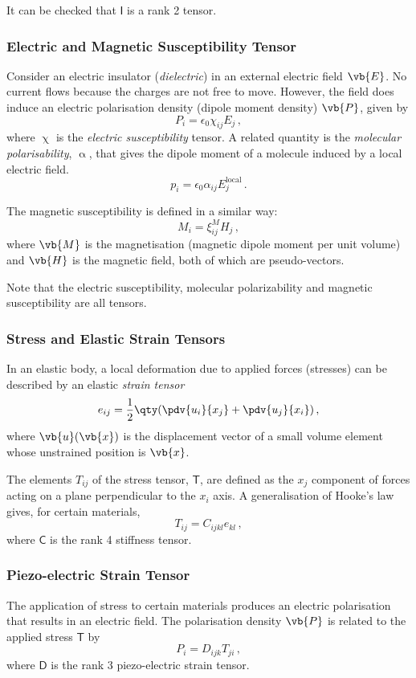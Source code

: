 \documentclass{article}
\theoremstyle{plain}\theoremheaderfont{\normalfont\itshape}\theorembodyfont{\rmfamily}\theoremseparator{.}\newtheorem*{rem}{Remark}\newtheorem*{ex}{Example}\newtheorem*{proof}{Proof}\newtheorem*{altp}{Alternative proof}
\theoremstyle{plain}\theoremheaderfont{\normalfont\bfseries}\theorembodyfont{\rmfamily}\theoremseparator{.}\newtheorem{thm}{Theorem}[section]\newtheorem{lem}[thm]{Lemma}\newtheorem{prop}[thm]{Proposition}\newtheorem*{cor}{Corollary}\newtheorem{defn}[thm]{Definition}\newtheorem{clm}[thm]{Claim}\newtheorem{clminproof}{Claim}
\theoremstyle{break}\theoremheaderfont{\normalfont\itshape}\theorembodyfont{\rmfamily}\theoremseparator{.\medskip}\newtheorem*{proofskip}{Proof}\newtheorem*{exs}{Examples}\newtheorem*{rems}{Remarks}
\theoremstyle{break}\theoremheaderfont{\normalfont\bfseries}\theorembodyfont{\rmfamily}\theoremseparator{.\medskip}\newtheorem{lemskip}[thm]{Lemma}\newtheorem{defnskip}[thm]{Definition}\newtheorem{propskip}[thm]{Proposition}\newtheorem{thmskip}[thm]{Theorem}
\numberwithin{equation}{section}
\begin{document}
	It can be checked that \(\mathsf{I}\) is a rank 2 tensor.

	\subsubsection{Electric and Magnetic Susceptibility Tensor}
	Consider an electric insulator (\textit{dielectric}) in an external electric field \(\vb{E}\). No current flows because the charges are not free to move. However, the field does induce an electric polarisation density (dipole moment density) \(\vb{P}\), given by
	\[P_i=\epsilon_0\chi_{ij}E_j\,,\]
	where \(\upchi\) is the \textit{electric susceptibility} tensor. A related quantity is the \textit{molecular polarisability}, \(\upalpha\), that gives the dipole moment of a molecule induced by a local electric field.
	\[p_i=\epsilon_0\alpha_{ij}E_j^\text{local}\,.\]

	The magnetic susceptibility is defined in a similar way:
	\[M_i=\xi_{ij}^MH_j\,,\]
	where \(\vb{M}\) is the magnetisation (magnetic dipole moment per unit volume) and \(\vb{H}\) is the magnetic field, both of which are pseudo-vectors.

	Note that the electric susceptibility, molecular polarizability and magnetic susceptibility are all tensors.

	\subsubsection{Stress and Elastic Strain Tensors}
	In an elastic body, a local deformation due to applied forces (stresses) can be described by an elastic \textit{strain tensor}
	\[e_{ij}=\frac{1}{2}\qty(\pdv{u_i}{x_j}+\pdv{u_j}{x_i})\,,\]
	where \(\vb{u}(\vb{x})\) is the displacement vector of a small volume element whose unstrained position is \(\vb{x}\).

	The elements \(T_{ij}\) of the stress tensor, \(\mathsf{T}\), are defined as the \(x_j\) component of forces acting on a plane perpendicular to the \(x_i\) axis. A generalisation of Hooke's law gives, for certain materials,
	\[T_{ij}=C_{ijkl}e_{kl}\,,\]
	where \(\mathsf{C}\) is the rank 4 stiffness tensor.

	\subsubsection{Piezo-electric Strain Tensor}
	The application of stress to certain materials produces an electric polarisation that results in an electric field. The polarisation density \(\vb{P}\) is related to the applied stress \(\mathsf{T}\) by
	\[P_i=D_{ijk}T_{ji}\,,\]
	where \(\mathsf{D}\) is the rank 3 piezo-electric strain tensor.
\end{document}
